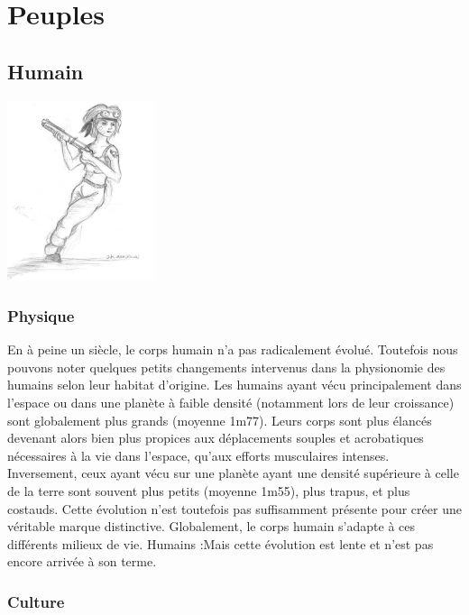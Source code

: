 \part{Peuples}

\chapter{Humain}

\begin{multicols}{2}

\begin{center}
	\includegraphics[width=123pt]{Img/humain}
\end{center}

\section{Physique}

En à peine un siècle, le corps humain n'a pas radicalement évolué. Toutefois nous pouvons noter quelques petits changements intervenus dans la physionomie des humains selon leur habitat d'origine. Les humains ayant vécu principalement dans l'espace ou dans une planète à faible densité (notamment lors de leur croissance) sont globalement plus grands (moyenne 1m77). Leurs corps sont plus élancés devenant alors bien plus propices aux déplacements souples et acrobatiques nécessaires à la vie dans l'espace, qu'aux efforts musculaires intenses. Inversement, ceux ayant vécu sur une planète ayant une densité supérieure à celle de la terre sont souvent plus petits (moyenne 1m55), plus trapus, et plus costauds. Cette évolution n'est toutefois pas suffisamment présente pour créer une véritable marque distinctive. Globalement, le corps humain s'adapte à ces différents milieux de vie. Humains :Mais cette évolution est lente et n'est pas encore arrivée à son terme.

\section{Culture}


\end{multicols}
